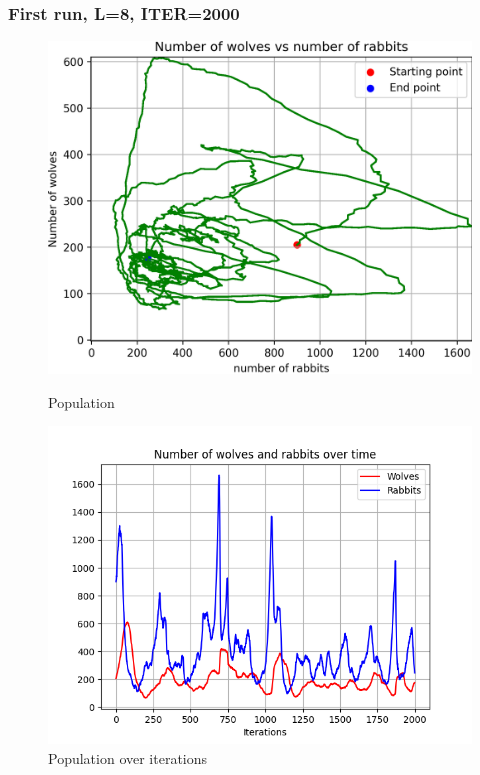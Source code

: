 \documentclass[unicode,11pt,a4paper,oneside,numbers=endperiod,openany]{scrartcl}
\begin{document}
\subsubsection*{First run, L=8, ITER=2000}
\begin{figure}[H]
  \centering
  \begin{minipage}[b]{0.435\textwidth}
    \centering
    \includegraphics[width=\textwidth]{output_main/Bestnew2_populations.png}
    \caption{Population}
  \end{minipage}
  \hfill
  \begin{minipage}[b]{0.49\textwidth}
    \centering
    \includegraphics[width=\textwidth]{output_main/Bestnew2.png}
    \caption{Population over iterations}
  \end{minipage}
\end{figure}
\end{document}

